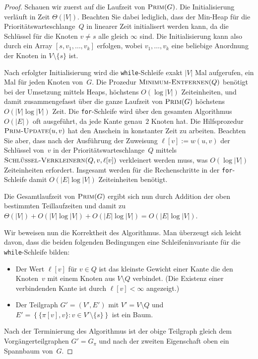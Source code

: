 \begin{proof}
Schauen wir zuerst auf die Laufzeit von $\mathop{\text{\textsc{Prim}}}(G)$.
Die Initialisierung verläuft in Zeit $\Theta(|V|)$.
Beachten Sie dabei lediglich, dass der Min-Heap für die Prioritätswarteschlange~$Q$ in linearer Zeit initialisert werden kann, da die Schlüssel für die Knoten $v \neq s$ alle gleich $\infty$ sind.
Die Initialisierung kann also durch ein Array $[s,v_1,\ldots,v_k]$ erfolgen, wobei $v_1,\ldots,v_k$ eine beliebige Anordnung der Knoten in $V \setminus \{s\}$ ist.

Nach erfolgter Initialisierung wird die \texttt{while}-Schleife exakt $|V|$ Mal aufgerufen, ein Mal für jeden Knoten von~$G$.
Die Prozedur $\mathop{\text{\textsc{Minimum-Entfernen}}}(Q)$ benötigt bei der Umsetzung mittels Heaps, höchstens $O(\log |V|)$ Zeiteinheiten, und damit zusammengefasst über die ganze Laufzeit von $\mathop{\text{\textsc{Prim}}}(G)$ höchstens $O(|V|\log|V|)$ Zeit.
Die \texttt{for}-Schleife wird über den gesamten Algorithmus $O(|E|)$ oft ausgeführt, da jede Kante genau~$2$ Knoten hat.
Die Hilfsprozedur $\mathop{\text{\textsc{Prim-Update}}}(u,v)$ hat den Anschein in konstanter Zeit zu arbeiten.
Beachten Sie aber, dass nach der Ausführung der Zuweisung $\ell[v]:=w(u,v)$ der Schlüssel von~$v$ in der Prioritätswarteschlange~$Q$ mittels $\mathop{\text{\textsc{Schlüssel-Verkleinern}}}(Q,v,\ell[v])$ verkleinert werden muss, was $O(\log|V|)$ Zeiteinheiten erfordert.
Insgesamt werden für die Rechenschritte in der \texttt{for}-Schleife damit $O(|E|\log|V|)$ Zeiteinheiten benötigt.

Die Gesamtlaufzeit von $\mathop{\text{\textsc{Prim}}}(G)$ ergibt sich nun durch Addition der oben bestimmten Teillaufzeiten und damit zu $\Theta(|V|)+O(|V|\log|V|)+O(|E|\log|V|) = O(|E|\log|V|)$.

Wir beweisen nun die Korrektheit des Algorithmus.
Man überzeugt sich leicht davon, dass die beiden folgenden Bedingungen eine Schleifeninvariante für die \texttt{while}-Schleife bilden: 
%
\begin{itemize}
 \item Der Wert $\ell[v]$ für $v \in Q$ ist das kleinste Gewicht einer Kante die den Knoten~$v$ mit einem Knoten aus $V \setminus Q$ verbindet.
 (Die Existenz einer verbindenden Kante ist durch $\ell[v] < \infty$ angezeigt.) 
 \item Der Teilgraph $G'=(V',E')$ mit $V' = V \setminus Q$ und $E' = \left\{\{\pi[v],v\} : v \in V' \setminus \{s\}\right\}$ ist ein Baum. 
\end{itemize}
%
Nach der Terminierung des Algorithmus ist der obige Teilgraph gleich dem Vorgängerteilgraphen $G' = G_\pi$ und nach der zweiten Eigenschaft oben ein Spannbaum von~$G$.


\end{proof}
